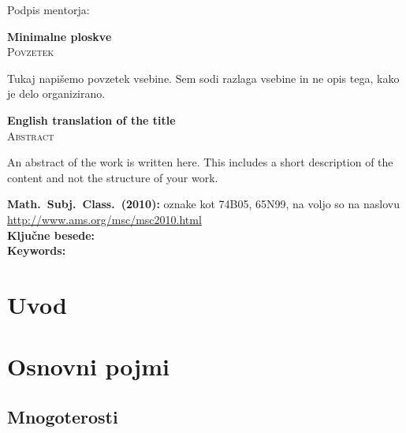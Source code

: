 \documentclass[12pt,a4paper,twoside]{article}
\newcommand{\naslovdela}{Minimalne ploskve}
\newcommand{\kljucnebesede}{} %
\newcommand{\keywords}{} %
\newcommand{\sep}{, }  %
\theoremstyle{definition} %
\theoremstyle{plain} %
\numberwithin{equation}{section}  %
\begin{document}
\vspace{2cm}
\hspace*{\fill} Podpis mentorja: \phantom{prostor za podpis}


\cleardoublepage
{}

\begin{center}
\textbf{\naslovdela} \\[3mm]
\textsc{Povzetek} \\[2mm]
\end{center}
Tukaj napišemo povzetek vsebine. Sem sodi razlaga vsebine in ne opis tega, kako je delo
organizirano.

\vfill
\begin{center}
\textbf{English translation of the title} \\[3mm] %
\textsc{Abstract}\\[2mm]
\end{center}

An abstract of the work is written here. This includes a short description of
the content and not the structure of your work.

\vfill\noindent
\textbf{Math.~Subj.~Class.~(2010):} oznake kot 74B05, 65N99, na voljo so na naslovu
\url{http://www.ams.org/msc/msc2010.html} \\[1mm]
\textbf{Ključne besede:} \kljucnebesede \\[1mm]
\textbf{Keywords:} \keywords

\cleardoublepage

\setcounter{page}{1}    %

\section{Uvod}

\section{Osnovni pojmi}

\subsection{Mnogoterosti}
\end{document}
